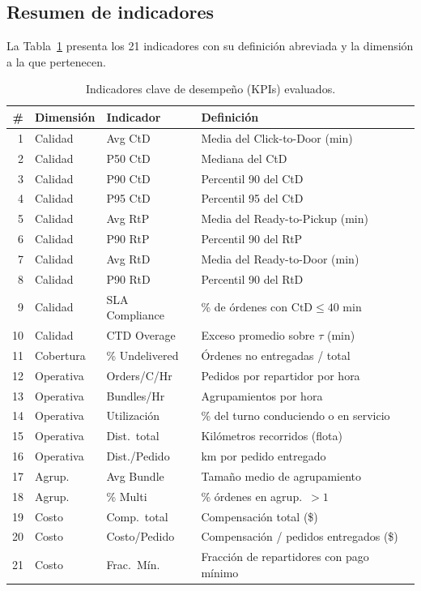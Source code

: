 \documentclass[12pt,letterpaper,oneside]{book}
\begin{document}
	\subsection{Resumen de indicadores}

	La Tabla~\ref{tab:kpis} presenta los 21 indicadores con su definición abreviada
	y la dimensión a la que pertenecen.

	\begin{table}[H]
		\centering
		\footnotesize
		\renewcommand{\arraystretch}{0.86}
		\caption{Indicadores clave de desempeño (KPIs) evaluados.}
		\label{tab:kpis}
		\begin{tabular}{@{}rllp{5.8cm}@{}}
			\toprule
			\# & Dimensión & Indicador & Definición \\
			\midrule
			 1 & Calidad   & Avg CtD        & Media del Click-to-Door (min) \\
			 2 & Calidad   & P50 CtD        & Mediana del CtD \\
			 3 & Calidad   & P90 CtD        & Percentil 90 del CtD \\
			 4 & Calidad   & P95 CtD        & Percentil 95 del CtD \\
			 5 & Calidad   & Avg RtP        & Media del Ready-to-Pickup (min) \\
			 6 & Calidad   & P90 RtP        & Percentil 90 del RtP \\
			 7 & Calidad   & Avg RtD        & Media del Ready-to-Door (min) \\
			 8 & Calidad   & P90 RtD        & Percentil 90 del RtD \\
			 9 & Calidad   & SLA Compliance & \% de órdenes con $\text{CtD} \leq 40$ min \\
			10 & Calidad   & CTD Overage    & Exceso promedio sobre $\tau$ (min) \\
			11 & Cobertura & \% Undelivered & Órdenes no entregadas / total \\
			12 & Operativa & Orders/C/Hr    & Pedidos por repartidor por hora \\
			13 & Operativa & Bundles/Hr     & Agrupamientos por hora \\
			14 & Operativa & Utilización    & \% del turno conduciendo o en servicio \\
			15 & Operativa & Dist.\ total   & Kilómetros recorridos (flota) \\
			16 & Operativa & Dist./Pedido   & km por pedido entregado \\
			17 & Agrup.    & Avg Bundle     & Tamaño medio de agrupamiento \\
			18 & Agrup.    & \% Multi       & \% órdenes en agrup.\ $> 1$ \\
			19 & Costo     & Comp.\ total   & Compensación total (\$) \\
			20 & Costo     & Costo/Pedido   & Compensación / pedidos entregados (\$) \\
			21 & Costo     & Frac.\ Mín.    & Fracción de repartidores con pago mínimo \\
			\bottomrule
		\end{tabular}
	\end{table}
\end{document}
